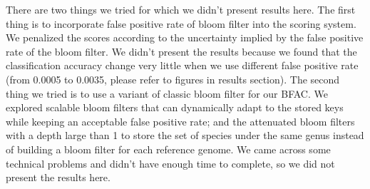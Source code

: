 \documentclass[12pt]{article} %
\begin{document}
\par
There are two things we tried for which we didn’t present results here. The first thing is to incorporate false positive rate of bloom filter into the scoring system. We penalized the scores according to the uncertainty implied by the false positive rate of the bloom filter. We didn’t present the results because we found that the classification accuracy change very little when we use different false positive rate (from 0.0005 to 0.0035, please refer to figures in results section). The second thing we tried is to use a variant of classic bloom filter for our BFAC. We explored scalable bloom filters that can dynamically adapt to the stored keys while keeping an acceptable false positive rate; and the attenuated bloom filters with a depth large than 1 to store the set of species under the same genus instead of building a  bloom filter for each reference genome. We came across some technical problems and didn’t have enough time to complete, so we did not present the results here.
\end{document}
